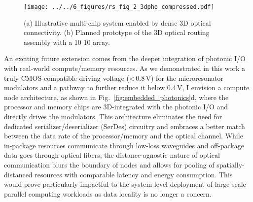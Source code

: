 \begin{wrapfigure}{l}{0.39\textwidth}
    \vspace{-1em}
    \begin{center}
        \texttt{[image: ../../6\_figures/rs\_fig\_2\_3dpho\_compressed.pdf]}
    \end{center}
    \caption{(a) Illustrative multi-chip system enabled by dense 3D optical connectivity. (b) Planned prototype of the 3D optical routing assembly with a 10 \texttimes{} 10 array.}
    \label{fig:3d_photonics}
    \vspace{-0.5em}
\end{wrapfigure}

An exciting future extension comes from the deeper integration of photonic I/O with real-world compute/memory resources. As we demonstrated in this work a truly CMOS-compatible driving voltage (<\,0.8\,V) for the microresonator modulators and a pathway to further reduce it below 0.4\,V, I envision a compute node architecture, as shown in Fig.~\ref{fig:embedded_photonics}d, where the processor and memory chips are 3D-integrated with the photonic I/O and directly drives the modulators. This architecture eliminates the need for dedicated serializer/deserializer (SerDes) circuitry and embraces a better match between the data rate of the processor/memory and the optical channel. While in-package resources communicate through low-loss waveguides and off-package data goes through optical fibers, the distance-agnostic nature of optical communication blurs the boundary of nodes and allows for pooling of spatially-distanced resources with comparable latency and energy consumption. This would prove particularly impactful to the system-level deployment of large-scale parallel computing workloads as data locality is no longer a concern.

